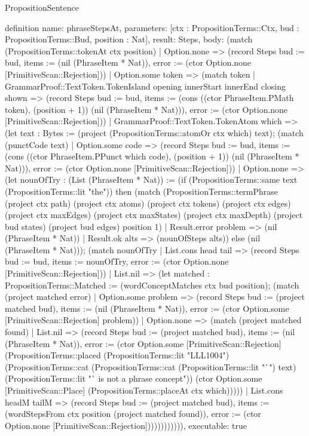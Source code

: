 \begin{lexlean}{PropositionSentence}
\begin{semanticmodule}
definition{
  name: phraseStepsAt,
  parameters: [ctx : PropositionTerms::Ctx, bud : PropositionTerms::Bud, position : Nat],
  result: Steps,
  body: (match (PropositionTerms::tokenAt ctx position)
    | Option.none => (record Steps {bud := bud, items := (nil (PhraseItem * Nat)), error := (ctor Option.none [PrimitiveScan::Rejection])})
    | Option.some token => (match token
      | GrammarProof::TextToken.TokenIsland opening innerStart innerEnd closing shown => (record Steps {bud := bud, items := (cons ((ctor PhraseItem.PMath token), (position + 1)) (nil (PhraseItem * Nat))), error := (ctor Option.none [PrimitiveScan::Rejection])})
      | GrammarProof::TextToken.TokenAtom which => (let text : Bytes := (project (PropositionTerms::atomOr ctx which) text); (match (punctCode text)
        | Option.some code => (record Steps {bud := bud, items := (cons ((ctor PhraseItem.PPunct which code), (position + 1)) (nil (PhraseItem * Nat))), error := (ctor Option.none [PrimitiveScan::Rejection])})
        | Option.none => (let nounOfTry : (List (PhraseItem * Nat)) := (if (PropositionTerms::same text (PropositionTerms::lit "the")) then (match (PropositionTerms::termPhrase (project ctx path) (project ctx atoms) (project ctx tokens) (project ctx edges) (project ctx maxEdges) (project ctx maxStates) (project ctx maxDepth) (project bud states) (project bud edges) position 1)
          | Result.error problem => (nil (PhraseItem * Nat))
          | Result.ok alts => (nounOfSteps alts)) else (nil (PhraseItem * Nat))); (match nounOfTry
          | List.cons head tail => (record Steps {bud := bud, items := nounOfTry, error := (ctor Option.none [PrimitiveScan::Rejection])})
          | List.nil => (let matched : PropositionTerms::Matched := (wordConceptMatches ctx bud position); (match (project matched error)
            | Option.some problem => (record Steps {bud := (project matched bud), items := (nil (PhraseItem * Nat)), error := (ctor Option.some [PrimitiveScan::Rejection] problem)})
            | Option.none => (match (project matched found)
              | List.nil => (record Steps {bud := (project matched bud), items := (nil (PhraseItem * Nat)), error := (ctor Option.some [PrimitiveScan::Rejection] (PropositionTerms::placed (PropositionTerms::lit "LLL1004") (PropositionTerms::cat (PropositionTerms::cat (PropositionTerms::lit "`") text) (PropositionTerms::lit "` is not a phrase concept")) (ctor Option.some [PrimitiveScan::Place] (PropositionTerms::placeAt ctx which))))})
              | List.cons headM tailM => (record Steps {bud := (project matched bud), items := (wordStepsFrom ctx position (project matched found)), error := (ctor Option.none [PrimitiveScan::Rejection])})))))))))),
  executable: true
}


\end{semanticmodule}
\end{lexlean}
